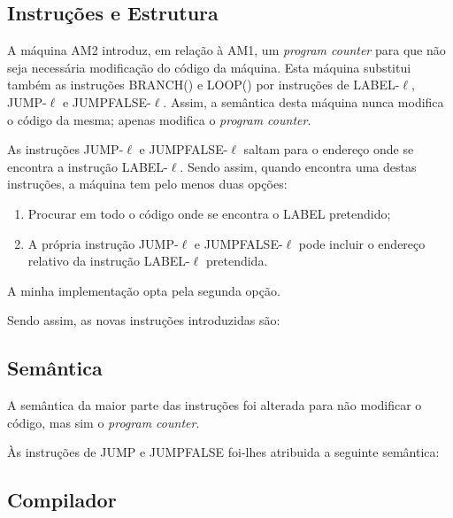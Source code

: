 \documentclass[11pt,a4paper]{report}
\begin{document}
\subsection{Instruções e Estrutura} \label{subsection:estrutura-maquina-am2}

\par A máquina AM2 introduz, em relação à AM1, um \textit{program counter} para que não seja necessária modificação do código da máquina. Esta máquina substitui também as instruções BRANCH() e LOOP() por instruções de LABEL-$\ell$, JUMP-$\ell$ e JUMPFALSE-$\ell$. Assim, a semântica desta máquina nunca modifica o código da mesma; apenas modifica o \textit{program counter}.

\par As instruções JUMP-$\ell$ e JUMPFALSE-$\ell$ saltam para o endereço onde se encontra a instrução LABEL-$\ell$. Sendo assim, quando encontra uma destas instruções, a máquina tem pelo menos duas opções:
\begin{enumerate}
    \item Procurar em todo o código onde se encontra o LABEL pretendido;
    \item A própria instrução JUMP-$\ell$ e JUMPFALSE-$\ell$ pode incluir o endereço relativo da instrução LABEL-$\ell$ pretendida.
\end{enumerate}
\par A minha implementação opta pela segunda opção.

\par Sendo assim, as novas instruções introduzidas são:

\newpage

\subsection{Semântica} \label{subsection:semantica-maquina-am2}

\par A semântica da maior parte das instruções foi alterada para não modificar o código, mas sim o \textit{program counter}.

\par Às instruções de JUMP e JUMPFALSE foi-lhes atribuida a seguinte semântica:

\subsection{Compilador} \label{subsection:compilador-maquina-am2}
\end{document}
